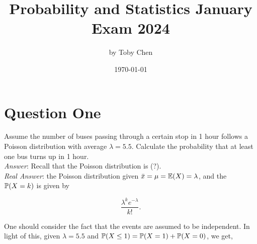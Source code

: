 \documentclass{article}
\title{Probability and Statistics January Exam 2024}
\author{by Toby Chen}
\date{\today}
\begin{document}
    \maketitle

    \tableofcontents

    \section{Question One}
    Assume the number of buses passing through a certain stop in 1 hour follows a Poisson distribution with average $\lambda= 5.5$. Calculate the probability that at least one bus turns up in 1 hour.\\

    \textit{Answer}: Recall that the Poisson distribution is (?). \xmark\\

    \textit{Real Answer}: the Poisson distribution given $\bar{x} = \mu = \mathbb{E}(X) = \lambda$, and the $\mathbb{P}(X = k)$ is given by

    \[\frac{\lambda^ke^{-\lambda}}{k!}.\]

    One should consider the fact that the events are assumed to be independent. In light of this, given $\lambda = 5.5$ and $\mathbb{P}(X \leq 1) = \mathbb{P}(X = 1) + \mathbb{P}(X = 0)$, we get,

    \[\]
\end{document}
